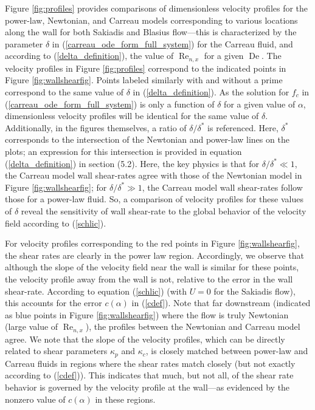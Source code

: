 \documentclass{article}
\begin{document}
Figure \ref{fig:profiles} provides comparisons of dimensionless velocity profiles for the power-law, Newtonian, and Carreau models corresponding to various locations along the wall for both Sakiadis and Blasius flow---this is characterized by the parameter $\delta$ in (\ref{carreau_ode_form_full_system}) for the Carreau fluid, and according to (\ref{delta_definition}), the value of $\operatorname{Re}_{n, x}$ for a given $\operatorname{De}$. The velocity profiles in Figure \ref{fig:profiles} correspond to the indicated points in Figure \ref{fig:wallshearfig}.  Points labeled similarly with and without a prime correspond to the same value of $\delta$ in (\ref{delta_definition}).  As the solution for $f_c$ in (\ref{carreau_ode_form_full_system}) is only a function of $\delta$ for a given value of $\alpha$, dimensionless velocity profiles will be identical for the same value of $\delta$.  Additionally, in the figures themselves, a ratio of $\delta/\delta^*$ is referenced.  Here, $\delta^*$ corresponds to the intersection of the Newtonian and power-law lines on the plots; an expression for this intersection is provided in equation (\ref{delta_definition}) in section (5.2).  Here, the key physics is that for $\delta/\delta^* \ll 1$, the Carreau model wall shear-rates agree with those of the Newtonian model in Figure \ref{fig:wallshearfig}; for $\delta/\delta^* \gg 1$, the Carreau model wall shear-rates follow those for a power-law fluid.  So, a comparison of velocity profiles for these values of $\delta$ reveal the sensitivity of wall shear-rate to the global behavior of the velocity field according to (\ref{schlic}).

For velocity profiles corresponding to the red points in Figure \ref{fig:wallshearfig}, the shear rates are clearly in the power law region.  Accordingly, we observe that although the slope of the velocity field near the wall is similar for these points, the velocity profile away from the wall is not, relative to the error in the wall shear-rate.  According to equation (\ref{schlic}) (with $U=0$ for the Sakiadis flow), this accounts for the error $c(\alpha)$ in (\ref{cdef}). Note that far downstream (indicated as blue points in Figure \ref{fig:wallshearfig}) where the flow is truly Newtonian (large value of $\operatorname{Re}_{n, x}$), the profiles between the Newtonian and Carreau model agree. We note that the slope of the velocity profiles, which can be directly related to shear parameters $\kappa_p$ and $\kappa_c$, is closely matched between power-law and Carreau fluids in regions where the shear rates match closely (but not exactly according to (\ref{cdef})).  This indicates that much, but not all, of the shear rate behavior is governed by the velocity profile at the wall---as evidenced by the nonzero value of $c(\alpha)$ in these regions.
\end{document}
